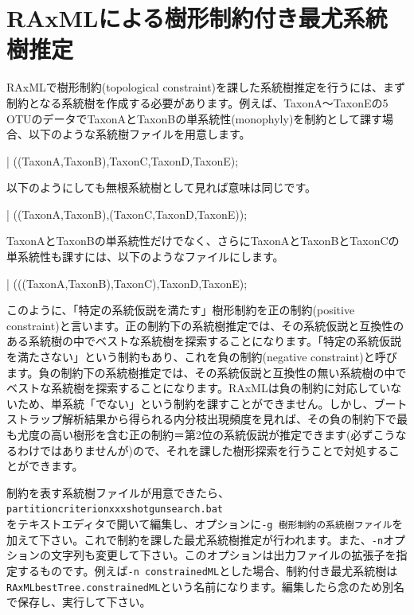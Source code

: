 \documentclass[titlepage,10pt,a4paper]{jsbook}
\newenvironment{content}{\begin{shaded}\vspace{-1em}\raggedright\ttfamily\footnotesize\setlength{\baselineskip}{1.4em}}{\end{shaded}\vspace{-1em}}
\begin{document}
\section{RAxMLによる樹形制約付き最尤系統樹推定}\label{section:constrainedsearch}

RAxMLで樹形制約(topological constraint)を課した系統樹推定を行うには、まず制約となる系統樹を作成する必要があります。例えば、TaxonA～TaxonEの5 OTUのデータでTaxonAとTaxonBの単系統性(monophyly)を制約として課す場合、以下のような系統樹ファイルを用意します。
\begin{content}
| ((TaxonA,TaxonB),TaxonC,TaxonD,TaxonE);
\end{content}
以下のようにしても無根系統樹として見れば意味は同じです。
\begin{content}
| ((TaxonA,TaxonB),(TaxonC,TaxonD,TaxonE));
\end{content}
TaxonAとTaxonBの単系統性だけでなく、さらにTaxonAとTaxonBとTaxonCの単系統性も課すには、以下のようなファイルにします。
\begin{content}
| (((TaxonA,TaxonB),TaxonC),TaxonD,TaxonE);
\end{content}
このように、「特定の系統仮説を満たす」樹形制約を正の制約(positive constraint)と言います。正の制約下の系統樹推定では、その系統仮説と互換性のある系統樹の中でベストな系統樹を探索することになります。「特定の系統仮説を満たさない」という制約もあり、これを負の制約(negative constraint)と呼びます。負の制約下の系統樹推定では、その系統仮説と互換性の無い系統樹の中でベストな系統樹を探索することになります。RAxMLは負の制約に対応していないため、単系統「でない」という制約を課すことができません。しかし、ブートストラップ解析結果から得られる内分枝出現頻度を見れば、その負の制約下で最も尤度の高い樹形を含む正の制約＝第2位の系統仮説が推定できます(必ずこうなるわけではありませんが)ので、それを課した樹形探索を行うことで対処することができます。

制約を表す系統樹ファイルが用意できたら、\\
\texttt{partition{\textunderscore}criterion{\textunderscore}xxx{\textunderscore}shotgunsearch.bat}\\
をテキストエディタで開いて編集し、オプションに\texttt{-g 樹形制約の系統樹ファイル}を加えて下さい。これで制約を課した最尤系統樹推定が行われます。また、\texttt{-n}オプションの文字列も変更して下さい。このオプションは出力ファイルの拡張子を指定するものです。例えば\texttt{-n constrainedML}とした場合、制約付き最尤系統樹は\texttt{RAxML{\textunderscore}bestTree.constrainedML}という名前になります。編集したら念のため別名で保存し、実行して下さい。
\end{document}
